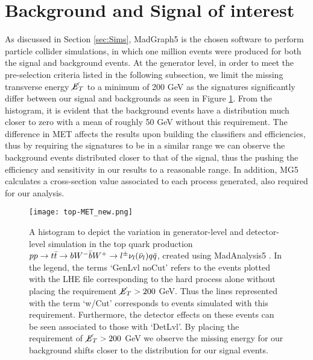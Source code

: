 \section{Background and Signal of interest}
As discussed in Section \ref{sec:Sims}, MadGraph5 is the chosen software to perform particle collider simulations, in which one million events were produced for both the signal and background events. At the generator level, in order to meet the pre-selection criteria listed in the following subsection, we limit the missing transverse energy $\cancel{\it{E}}_{T}$ to a minimum of 200 GeV as the signatures significantly differ between our signal and backgrounds as seen in Figure \ref{fig:topMET}. From the histogram, it is evident that the background events have a distribution much closer to zero with a mean of roughly 50 GeV without this requirement. The difference in MET affects the results upon building the classifiers and efficiencies, thus by requiring the signatures to be in a similar range we can observe the background events distributed closer to that of the signal, thus the pushing the efficiency and sensitivity in our results to a reasonable range. In addition, MG5 calculates a cross-section value associated to each process generated, also required for our analysis. \\

\begin{figure}[htbp]
    \centering
    \texttt{[image: top-MET\_new.png]}
    \caption{A histogram to depict the variation in generator-level and detector-level simulation in the top quark production $pp \rightarrow t\Bar{t} \rightarrow bW^{-}\Bar{b}W^{+} \rightarrow l^{\pm}\nu_l(\Bar{\nu}_l)q\Bar{q}$, created using MadAnalysis5 \cite{conte2013madanalysis, conte2014designing, dumont2015toward}. In the legend, the terms `GenLvl noCut' refers to the events plotted with the LHE file corresponding to the hard process alone without placing the requirement $\cancel{\it{E}}_{T}>200$ GeV. Thus the lines represented with the term `w/Cut' corresponds to events simulated with this requirement. Furthermore, the detector effects on these events can be seen associated to those with `DetLvl'. By placing the requirement of $\cancel{\it{E}}_{T}>200$ GeV we observe the missing energy for our background shifts closer to the distribution for our signal events. }
    \label{fig:topMET}
\end{figure}

